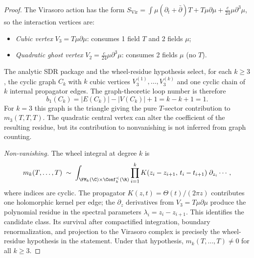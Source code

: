 \begin{proof}
The Virasoro action has the form $S_{\mathrm{Vir}} = \int \mu(\partial_t + \bar\partial) T + T\mu\partial\mu + \tfrac{c}{24}\mu\partial^3\mu$, so the interaction vertices are:
\begin{itemize}
\item \emph{Cubic vertex} $V_3 = T\mu\partial\mu$: consumes 1 field $T$ and 2 fields $\mu$;
\item \emph{Quadratic ghost vertex} $V_2 = \tfrac{c}{24}\mu\partial^3\mu$: consumes 2 fields $\mu$ (no $T$).
\end{itemize}

The analytic SDR package and the wheel-residue hypothesis select, for
each $k\ge3$, the cyclic graph $C_k$ with $k$ cubic vertices
$V_3^{(1)},\ldots,V_3^{(k)}$ and one cyclic chain of $k$ internal
propagator edges. The graph-theoretic loop number is therefore
\[
b_1(C_k)=|E(C_k)|-|V(C_k)|+1=k-k+1=1.
\]
For $k=3$ this graph is the triangle giving the pure $T$-sector
contribution to $m_3(T,T,T)$. The quadratic central vertex can alter
the coefficient of the resulting residue, but its contribution to
nonvanishing is not inferred from graph counting.

\emph{Non-vanishing.} The wheel integral at degree $k$ is
\[
m_k(T, \ldots, T) \;\sim\; \int_{\FM_k(\C) \times \Conf_k^{<}(\R)}
 \prod_{i=1}^k K(z_i - z_{i+1},\, t_i - t_{i+1})\; \partial_{z_i}\cdots,
\]
where indices are cyclic. The propagator $K(z,t) = \Theta(t)/(2\pi z)$
contributes one holomorphic kernel per edge; the
$\partial_z$ derivatives from $V_3 = T\mu\partial\mu$ produce the
polynomial residue in the spectral parameters
$\lambda_i = z_i - z_{i+1}$. This identifies the candidate class. Its
survival after compactified integration, boundary renormalization, and
projection to the Virasoro complex is precisely the wheel-residue
hypothesis in the statement. Under that hypothesis,
$m_k(T,\ldots,T)\ne0$ for all $k\ge3$.
\end{proof}

